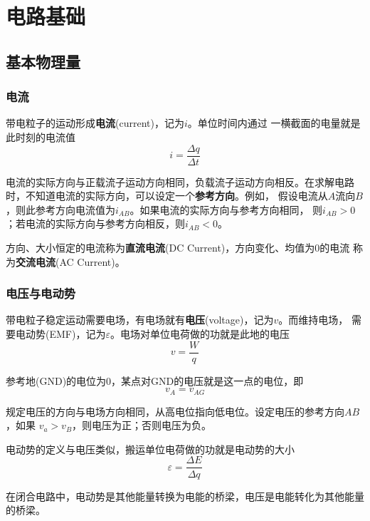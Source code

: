 
    \chapter{电路基础}

    \section{基本物理量}

    \subsection{电流}
    \par 带电粒子的运动形成\textbf{电流}(current)，记为$i$。单位时间内通过
    一横截面的电量就是此时刻的电流值
    \[
    i=\frac{\Delta q}{\Delta t}    
    \]
    \par 电流的实际方向与正载流子运动方向相同，负载流子运动方向相反。在求解电路时，不知道电流的实际方向，可以设定一个\textbf{参考方向}。例如，
    假设电流从$A$流向$B$，则此参考方向电流值为$i_{AB}$。如果电流的实际方向与参考方向相同，
    则$i_{AB}>0$；若电流的实际方向与参考方向相反，则$i_{AB}<0$。
    \par 方向、大小恒定的电流称为\textbf{直流电流}(DC Current)，方向变化、均值为0的电流
    称为\textbf{交流电流}(AC Current)。
    \subsection{电压与电动势}
    \par 带电粒子稳定运动需要电场，有电场就有\textbf{电压}(voltage)，记为$v$。而维持电场，
    需要电动势(EMF)，记为$\varepsilon$。电场对单位电荷做的功就是此地的电压
    \[
    v=\frac{W}{q}    
    \]
    \par 参考地(GND)的电位为0，某点对GND的电压就是这一点的电位，即
    \[
    v_A=v_{AG}    
    \]
    \par 规定电压的方向与电场方向相同，从高电位指向低电位。设定电压的参考方向$AB$，如果
    $v_a>v_B$，则电压为正；否则电压为负。
    \par 电动势的定义与电压类似，搬运单位电荷做的功就是电动势的大小
    \[
    \varepsilon=\frac{\Delta E}{\Delta q}    
    \]
    \par 在闭合电路中，电动势是其他能量转换为电能的桥梁，电压是电能转化为其他能量的桥梁。
    \begin{center}
    \end{center}
